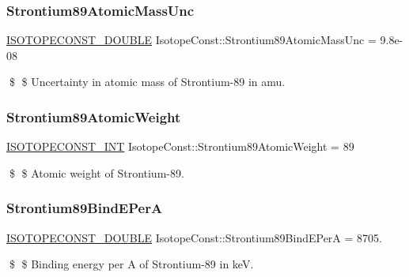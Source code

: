 \subsubsection{\texorpdfstring{Strontium89\+Atomic\+Mass\+Unc}{Strontium89AtomicMassUnc}}
{\footnotesize\ttfamily \mbox{\hyperlink{group___isotope_const-_macros_ga8f45a7272ce02c0b4c65c44636ed719a}{I\+S\+O\+T\+O\+P\+E\+C\+O\+N\+S\+T\+\_\+\+D\+O\+U\+B\+LE}} Isotope\+Const\+::\+Strontium89\+Atomic\+Mass\+Unc = 9.\+8e-\/08}

\$ \$ Uncertainty in atomic mass of Strontium-\/89 in amu. \mbox{\label{group___isotope_const-_strontium-_sr89_ga4656d6dcf290b4439b1a6c89d85427eb}} 
\subsubsection{\texorpdfstring{Strontium89\+Atomic\+Weight}{Strontium89AtomicWeight}}
{\footnotesize\ttfamily \mbox{\hyperlink{group___isotope_const-_macros_ga5f18360b3e99483a35c32d789e62621c}{I\+S\+O\+T\+O\+P\+E\+C\+O\+N\+S\+T\+\_\+\+I\+NT}} Isotope\+Const\+::\+Strontium89\+Atomic\+Weight = 89}

\$ \$ Atomic weight of Strontium-\/89. \mbox{\label{group___isotope_const-_strontium-_sr89_ga9c06cec7052a2f848facdfc38e76c42e}} 
\subsubsection{\texorpdfstring{Strontium89\+Bind\+E\+PerA}{Strontium89BindEPerA}}
{\footnotesize\ttfamily \mbox{\hyperlink{group___isotope_const-_macros_ga8f45a7272ce02c0b4c65c44636ed719a}{I\+S\+O\+T\+O\+P\+E\+C\+O\+N\+S\+T\+\_\+\+D\+O\+U\+B\+LE}} Isotope\+Const\+::\+Strontium89\+Bind\+E\+PerA = 8705.}

\$ \$ Binding energy per A of Strontium-\/89 in keV. \mbox{\label{group___isotope_const-_strontium-_sr89_gac93be7d06b89ba40d6d8d5c1f60244cd}} 
